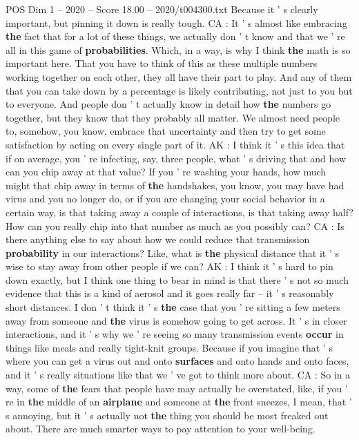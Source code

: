 \begin{textsample}{POS Dim 1 – 2020 – Score 18.00 – 2020/t004300.txt}
Because it ' s clearly important, but pinning it down is really tough.
CA : It ' s almost like embracing \textbf{the} fact that for a lot of these things, we actually don ' t know and that we ' re all in this game of \textbf{probabilities}.
Which, in a way, is why I think \textbf{the} math is so important here.
That you have to think of this as these multiple numbers working together on each other, they all have their part to play.
And any of them that you can take down by a percentage is likely contributing, not just to you but to everyone.
And people don ' t actually know in detail how \textbf{the} numbers go together, but they know that they probably all matter.
We almost need people to, somehow, you know, embrace that uncertainty and then try to get some satisfaction by acting on every single part of it.
AK : I think it ' s this idea that if on average, you ' re infecting, say, three people, what ' s driving that and how can you chip away at that value?
If you ' re washing your hands, how much might that chip away in terms of \textbf{the} handshakes, you know, you may have had virus and you no longer do, or if you are changing your social behavior in a certain way, is that taking away a couple of interactions, is that taking away half?
How can you really chip into that number as much as you possibly can?
CA : Is there anything else to say about how we could reduce that transmission \textbf{probability} in our interactions?
Like, what is \textbf{the} physical distance that it ' s wise to stay away from other people if we can?
AK : I think it ' s hard to pin down exactly, but I think one thing to bear in mind is that there ' s not so much evidence that this is a kind of aerosol and it goes really far -- it ' s reasonably short distances.
I don ' t think it ' s \textbf{the} case that you ' re sitting a few meters away from someone and \textbf{the} virus is somehow going to get across.
It ' s in closer interactions, and it ' s why we ' re seeing so many transmission events \textbf{occur} in things like meals and really tight-knit groups.
Because if you imagine that ' s where you can get a virus out and onto \textbf{surfaces} and onto hands and onto faces, and it ' s really situations like that we ' ve got to think more about.
CA : So in a way, some of \textbf{the} fears that people have may actually be overstated, like, if you ' re in \textbf{the} middle of an \textbf{airplane} and someone at \textbf{the} front sneezes, I mean, that ' s annoying, but it ' s actually not \textbf{the} thing you should be most freaked out about.
There are much smarter ways to pay attention to your well-being.

\end{textsample}
